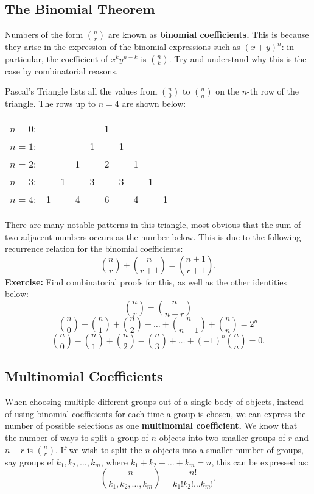\documentclass[12pt]{article}
\begin{document}
\subsection{The Binomial Theorem}
Numbers of the form $\binom{n}{r}$ are known as \textbf{binomial coefficients.} This is because they arise in the expression of the binomial expressions such as $(x+y)^n$: in particular, the coefficient of $x^ky^{n-k}$ is $\binom{n}{k}$. Try and understand why this is the case by combinatorial reasons.

\vspace{2mm}

\noindent Pascal's Triangle lists all the values from $\binom{n}{0}$ to $\binom{n}{n}$ on the $n$-th row of the triangle. The rows up to $n=4$ are shown below:
\begin{center}
	\begin{tabular}{ c c c c c c c c c c }
		$n=0$: & & & & &1& & & & \\ 
		$n=1$: & & & &1& &1& & & \\  
		$n=2$: & & &1& &2& &1& & \\  
		$n=3$: & &1& &3& &3& &1& \\  
		$n=4$: &1& &4& &6& &4& &1\\  
	\end{tabular}
\end{center}
There are many notable patterns in this triangle, most obvious that the sum of two adjacent numbers occurs as the number below. This is due to the following recurrence relation for the binomial coefficients: \[\binom{n}{r}+\binom{n}{r+1}=\binom{n+1}{r+1}.\] \textbf{Exercise:} Find combinatorial proofs for this, as well as the other identities below: \[\binom{n}{r}=\binom{n}{n-r}\] \[\binom{n}{0}+\binom{n}{1}+\binom{n}{2}+\dots+\binom{n}{n-1}+\binom{n}{n}=2^n\] \[\binom{n}{0}-\binom{n}{1}+\binom{n}{2}-\binom{n}{3}+\dots+(-1)^n\binom{n}{n}=0.\]
\subsection{Multinomial Coefficients}
When choosing multiple different groups out of a single body of objects, instead of using binomial coefficients for each time a group is chosen, we can express the number of possible selections as one \textbf{multinomial coefficient.} We know that the number of ways to split a group of $n$ objects into two smaller groups of $r$ and $n-r$ is $\binom{n}{r}$. If we wish to split the $n$ objects into a smaller number of groups, say groups ef $k_1,k_2,\dots,k_m$, where $k_1+k_2+\dots+k_m=n$, this can be expressed as: \[\binom{n}{k_1,k_2,\dots,k_m}=\frac{n!}{k_1!k_2!\dots k_m!}.\]
\end{document}
